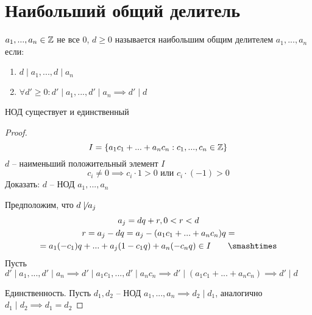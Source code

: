 \documentclass[main]{subfiles}
\begin{document}
\chapter[НОД]{Наибольший общий делитель}

$a_1, ..., a_n \in \mathbb{Z}$ не все $0$, $d\ge 0$ называется наибольшим
общим делителем $a_1, ..., a_n$ если:
\begin{enumerate}
    \item $d \mid a_1, ...,  d\mid  a_n$
    \item $\forall d' \ge 0: d'\mid a_1, ..., d' \mid a_n \implies d'\mid d$
\end{enumerate}

\begin{definition}
    НОД существует и единственный
\end{definition}
\begin{proof}
    \[I = \{a_1 c_1+ ... + a_n c_n : c_1, ..., c_n \in \mathbb{Z}\}\]
    $d$ -- наименьший положительный элемент $I$
    \[c_i \neq 0 \implies c_i \cdot 1 >0 \text{ или } c_i\cdot(-1)>0\]
    Доказать: $d$ -- НОД $a_1, ..., a_n$

    Предположим, что $d \not\mid a_j$
    \begin{gather*}
        a_j = dq+r, 0 < r < d\\
        r = a_j -dq = a_j - (a_1 c_1 + ... + a_n c_n)q=\\
        = a_1 (-c_1)q + ... + a_j(1-c_1q ) + a_n (-c_nq) \in I \qquad \contradiction
    \end{gather*}
    Пусть $d' \mid a_1, ..., d'\mid a_n \implies d'\mid a_1 c_1, ...,
        d'\mid a_n c_n \implies d' \mid (a_1 c_1 + ... + a_n c_n) \implies d'\mid d$

    Единственность. Пусть $d_1, d_2$ -- НОД $a_1, ..., a_n \implies d_2 \mid d_1$,
    аналогично $d_1\mid d_2 \implies d_1 = d_2$
\end{proof}
\end{document}
